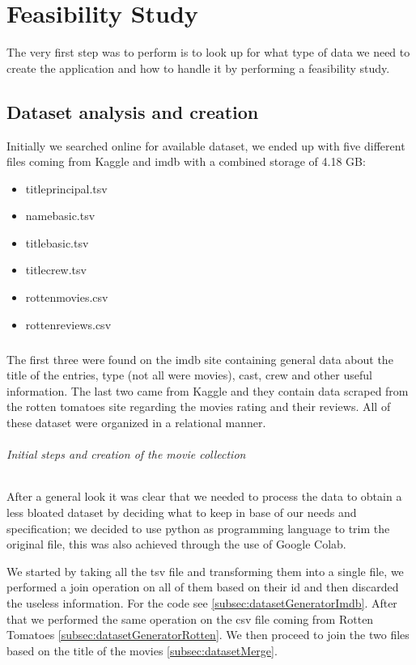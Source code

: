 %


%

\chapter{Feasibility Study}
\justifying
The very first step was to perform is to look up for what type of data we need to create the application and how to handle it by performing a feasibility study.
\section{Dataset analysis and creation}
Initially we searched online for available dataset, we ended up with five different files coming from Kaggle and imdb with a combined storage of 4.18 GB:
\begin{itemize}
  \item title\textunderscore principal.tsv  
  \item name\textunderscore basic.tsv 
  \item title\textunderscore basic.tsv 
  \item title\textunderscore crew.tsv
  \item rotten\textunderscore movies.csv
  \item rotten\textunderscore reviews.csv 
\end{itemize} 
\paragraph{}
The first three were found on the imdb site containing general data about the title of the entries, type (not all were movies), cast, crew and other useful information. The last two came from Kaggle and they contain data scraped from the rotten tomatoes site regarding the movies rating and their reviews. All of these dataset were organized in a relational manner.
\subparagraph{Initial steps and creation of the movie collection}
After a general look it was clear that we needed to process the data to obtain a less bloated dataset by deciding what to keep in base of our needs and specification; we decided to use python as programming language to trim the original file, this was also achieved through the use of Google Colab.

We started by taking all the tsv file and transforming them into a single file, we performed a join operation on all of them based on their id and then discarded the useless information. For the code see  \cref{subsec:datasetGeneratorImdb}. After that we performed the same operation on the csv file coming from Rotten Tomatoes \cref{subsec:datasetGeneratorRotten}. We then proceed to join the two files based on the title of the movies \cref{subsec:datasetMerge}.

